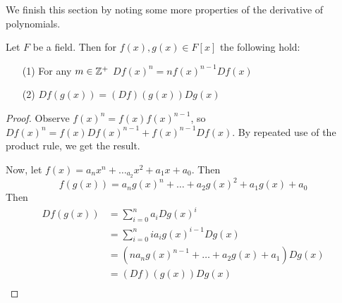 We finish this section by noting some more properties of the
derivative of polynomials.

\begin{proposition}\label{proposition_8.6.8}
  Let $F$ be a field. Then for $f(x), g(x) \in F[x]$ the following
  hold:
  \begin{enumerate}
    \item[(1)] For any $m \in \mathbb{Z}^+$ $D{f(x)^n}=nf(x)^{n-1}D{f(x)}$

    \item[(2)] $D{f(g(x))}=(D{f})(g(x))D{g(x)}$
  \end{enumerate}
\end{proposition}
\begin{proof}
  Observe $f(x)^n=f(x)f(x)^{n-1}$, so
  $D{f(x)^n}=f(x)D{f(x)^{n-1}}+f(x)^{n-1}D{f(x)}$. By repeated use of
  the product rule, we get the result.

  Now, let $f(x)=a_nx^n+\dots_a_2x^2+a_1x+a_0$. Then
  \begin{equation*}
    f(g(x))=a_ng(x)^n+\dots+a_2g(x)^2+a_1g(x)+a_0
  \end{equation*}
  Then
  \begin{align*}
    D{f(g(x))} &= \sum_{i=0}^{n}{a_iD{g(x)^i}} \\
    &= \sum_{i=0}^n{ia_ig(x)^{i-1}D{g(x)}} \\
    &= (na_ng(x)^{n-1}+\dots+a_2g(x)+a_1)D{g(x)} \\
    &= (D{f})(g(x))D{g(x)} \\
  \end{align*}
\end{proof}
